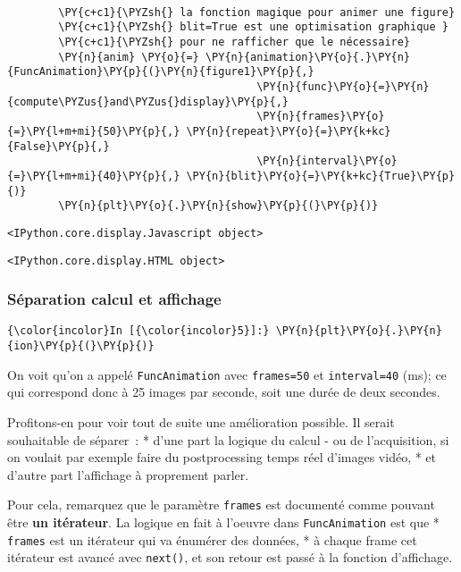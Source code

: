 \begin{Verbatim}[commandchars=\\\{\}]
        
        \PY{c+c1}{\PYZsh{} la fonction magique pour animer une figure}
        \PY{c+c1}{\PYZsh{} blit=True est une optimisation graphique }
        \PY{c+c1}{\PYZsh{} pour ne rafficher que le nécessaire}
        \PY{n}{anim} \PY{o}{=} \PY{n}{animation}\PY{o}{.}\PY{n}{FuncAnimation}\PY{p}{(}\PY{n}{figure1}\PY{p}{,} 
                                       \PY{n}{func}\PY{o}{=}\PY{n}{compute\PYZus{}and\PYZus{}display}\PY{p}{,} 
                                       \PY{n}{frames}\PY{o}{=}\PY{l+m+mi}{50}\PY{p}{,} \PY{n}{repeat}\PY{o}{=}\PY{k+kc}{False}\PY{p}{,}
                                       \PY{n}{interval}\PY{o}{=}\PY{l+m+mi}{40}\PY{p}{,} \PY{n}{blit}\PY{o}{=}\PY{k+kc}{True}\PY{p}{)}
        \PY{n}{plt}\PY{o}{.}\PY{n}{show}\PY{p}{(}\PY{p}{)}
\end{Verbatim}


    
    \begin{verbatim}
<IPython.core.display.Javascript object>
    \end{verbatim}

    
    
    \begin{verbatim}
<IPython.core.display.HTML object>
    \end{verbatim}

    
    \hypertarget{suxe9paration-calcul-et-affichage}{%
\subsubsection{Séparation calcul et
affichage}\label{suxe9paration-calcul-et-affichage}}

    \begin{Verbatim}[commandchars=\\\{\}]
{\color{incolor}In [{\color{incolor}5}]:} \PY{n}{plt}\PY{o}{.}\PY{n}{ion}\PY{p}{(}\PY{p}{)}
\end{Verbatim}


    On voit qu'on a appelé \texttt{FuncAnimation} avec \texttt{frames=50} et
\texttt{interval=40} (ms); ce qui correspond donc à 25 images par
seconde, soit une durée de deux secondes.

Profitons-en pour voir tout de suite une amélioration possible. Il
serait souhaitable de séparer~: * d'une part la logique du calcul - ou
de l'acquisition, si on voulait par exemple faire du postprocessing
temps réel d'images vidéo, * et d'autre part l'affichage à proprement
parler.

    Pour cela, remarquez que le paramètre \texttt{frames} est documenté
comme pouvant être \textbf{un itérateur}. La logique en fait à l'oeuvre
dans \texttt{FuncAnimation} est que * \texttt{frames} est un itérateur
qui va énumérer des données, * à chaque frame cet itérateur est avancé
avec \texttt{next()}, et son retour est passé à la fonction d'affichage.

